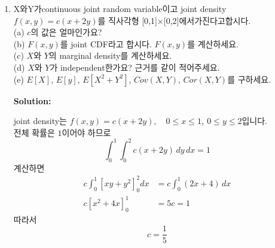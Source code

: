 \documentclass{article}
\newenvironment{solution}
{
    \par\medskip
    \noindent\textbf{Solution:}
    \begin{adjustwidth}{1em}{0em}
}
{
    \end{adjustwidth}
    \medskip
}
\begin{document}
\begin{enumerate}[label=\textbf{\arabic*.}, leftmargin=*]
    \begin{solution}
    각 사람에 대해 random variable을 정의하면 다음과 같습니다.  
    $$  
    I_i=  
    \begin{cases}  
        1, & i\text{번째 사람이 자기 모자를 돌려받으면}\\  
        0, & \text{otherwise}  
    \end{cases}  
    $$  
    자기 모자를 돌려받는 전체 사람 수를 $X$라고 하면  
    $$  
    X=I_1+I_2+\cdots+I_{100}  
    $$  
    입니다.  
    각 사람이 자기 모자를 받을 확률은  
    $$  
    P(I_i=1)=\frac1{100}  
    $$  
    이므로  
    $$  
    E[I_i]=\frac1{100}  
    $$  
    입니다.  
    따라서 기대값의 선형성에 의해  
    \begin{align*}  
        E[X]&=E[I_1+\cdots+I_{100}]  \\
        &=E[I_1]+\cdots+E[I_{100}]  \\
        &=100\cdot\frac1{100}\\
        &=1  
    \end{align*} 
    따라서 자신의 모자를 돌려받는 것으로 예상되는 사람의 수는 1명입니다.
    \end{solution}

\newpage

\item X와Y가continuous joint random variable이고 joint density $f(x,y) = c(x+2y)$를 직사각형 [0,1]×[0,2]에서가진다고합시다.\\
(a) $c$의 값은 얼마인가요?\\
(b) $F(x,y)$를 joint CDF라고 합시다. $F(x,y)$를 계산하세요.\\
(c) $X$와 $Y$의 marginal density를 계산하세요.\\
(d) $X$와 $Y$가 independent한가요? 근거를 같이 적어주세요.\\
(e) $E[X]$, $E[y]$, $E[X^2 +Y^2]$, $Cov(X,Y)$, $Cor(X,Y)$를 구하세요.

    \begin{solution}
        \begin{enumerate}[label=(\alph*), leftmargin=2em, itemsep=1em]
            
             joint density는  $f(x,y)=c(x+2y),\quad 0\le x\le 1,\ 0\le y\le 2$입니다.\\  
            전체 확률은 $1$이어야 하므로  
            $$  
            \int_0^1\int_0^2 c(x+2y)\,dy\,dx=1  
            $$  
            계산하면  
            \begin{align*}
                c\int_0^1\left[xy+y^2\right]_0^2dx &=c\int_0^1(2x+4)\,dx \\ 
                c\left[x^2+4x\right]_0^1&=5c=1  
            \end{align*}  
            따라서  
            $$  
            c=\frac15  
            $$  


\end{enumerate}
\end{solution}
\end{enumerate}
\end{document}
